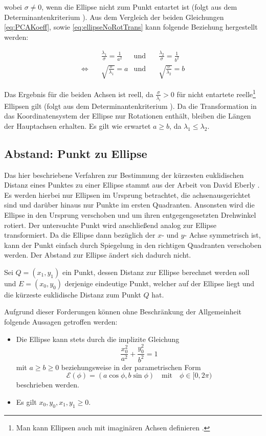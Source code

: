 wobei $\sigma \neq 0$, wenn die Ellipse nicht zum Punkt entartet ist (folgt aus dem Determinantenkriterium \cite{Lawrence1972}). Aus dem Vergleich der beiden Gleichungen \ref{eq:PCAKoeff}, sowie \ref{eq:ellipseNoRotTrans} kann folgende Beziehung hergestellt werden:

\begin{equation}
\begin{aligned}
&\frac{\lambda_1}{\sigma} = \frac{1}{a^2} &\text{und}\quad &\frac{\lambda_2}{\sigma} = \frac{1}{b^2}\\
\Leftrightarrow\quad & \sqrt{\frac{\sigma}{\lambda_1}}  = a  &\text{und}\quad & \sqrt{\frac{\sigma}{\lambda_2}}  = b
\end{aligned}
\end{equation}

Das Ergebnis für die beiden Achsen ist reell, da $\frac{\sigma}{\lambda_i} > 0$ für nicht entartete reelle\footnote{Man kann Ellipsen auch mit imaginären Achsen definieren \cite{Lawrence1972}.}  Ellipsen gilt (folgt aus dem Determinantenkriterium \cite{Lawrence1972}). Da die Transformation in das Koordinatensystem der Ellipse nur Rotationen enthält,  bleiben die Längen der Hauptachsen erhalten. Es gilt wie erwartet $a \geq b$, da $\lambda_1 \leq \lambda_2$.


\subsection{Abstand: Punkt zu Ellipse}
\label{sc:distPointEllipse}
Das hier beschriebene Verfahren zur Bestimmung der kürzesten euklidischen Distanz eines Punktes zu einer Ellipse stammt aus der Arbeit von David Eberly \cite{Eberly2013}.
Es werden hierbei nur Ellipsen im Ursprung betrachtet, die achsenausgerichtet sind und darüber hinaus nur Punkte im ersten Quadranten. Ansonsten wird die Ellipse in den Ursprung verschoben und um ihren entgegengesetzten Drehwinkel rotiert.
Der untersuchte Punkt wird anschließend analog zur Ellipse transformiert.
Da die Ellipse dann bezüglich der $x$- und $y$- Achse symmetrisch ist, kann der Punkt einfach durch Spiegelung in den richtigen Quadranten verschoben werden. Der Abstand zur Ellipse ändert sich dadurch nicht.

Sei $Q = (x_1, y_1)$ ein Punkt, dessen Distanz zur Ellipse berechnet werden soll und $E = (x_0, y_0)$ derjenige eindeutige Punkt, welcher auf der Ellipse liegt und die kürzeste euklidische Distanz zum Punkt $Q$ hat.

Aufgrund dieser Forderungen können ohne Beschränkung der Allgemeinheit folgende Aussagen getroffen werden:
\begin{itemize}
	\item Die Ellipse kann stets durch die implizite Gleichung
	\begin{equation}\label{eq:distEqParam} \frac{x_0^2}{a^2} + \frac{y_0^2}{b^2} = 1\end{equation}
	 mit $a \geq b \geq 0$ beziehungsweise
	in der parametrischen Form
	\[
	\mathcal{E}(\phi) = (a\cos\phi, b\sin\phi) \quad \text{mit}\quad \phi \in [0, 2\pi)
	\] %
	beschrieben werden.
	\item Es gilt $x_0,y_0,x_1,y_1 \geq 0$.
\end{itemize}

